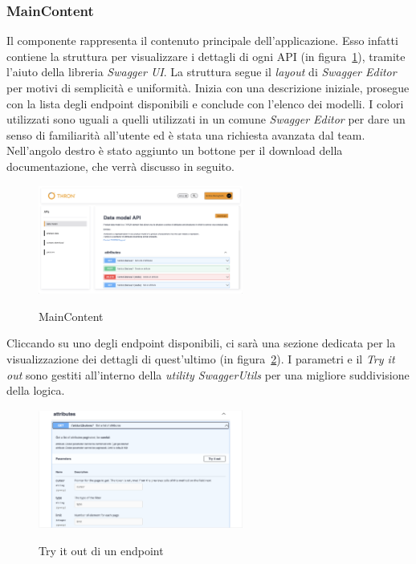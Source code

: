 \subsubsection{MainContent}\label{subsubsec:main-content}
Il componente rappresenta il contenuto principale dell'applicazione. Esso infatti contiene la struttura per visualizzare i dettagli di ogni API (in figura~\ref{fig:main-content}), tramite l'aiuto 
della libreria \textit{Swagger UI}.
La struttura segue il \textit{layout} di \textit{Swagger Editor} per motivi di semplicità e uniformità. Inizia con una descrizione iniziale, prosegue con la lista degli endpoint disponibili e conclude con l'elenco dei modelli.
I colori utilizzati sono uguali a quelli utilizzati in un comune \textit{Swagger Editor} per dare un senso di familiarità all'utente ed è stata una richiesta avanzata dal team.
Nell'angolo destro è stato aggiunto un bottone per il download della documentazione, che verrà discusso in seguito.
\begin{figure}[ht]
  \centering
  \includegraphics[width=0.6\textwidth, alt={Sezione per la visualizzazione dei dettagli di un API}]{images/frontend/DataModelView.jpg}
  \caption{MainContent}\label{fig:main-content}
\end{figure}
\pagebreak

Cliccando su uno degli endpoint disponibili, ci sarà una sezione dedicata per la visualizzazione dei dettagli di quest'ultimo (in figura~\ref{fig:try-it-out}).
I parametri e il \textit{Try it out} sono gestiti all'interno della \textit{utility SwaggerUtils} per una migliore suddivisione della logica.

\begin{figure}[ht]
  \centering
  \includegraphics[width=0.6\textwidth, alt={Sezione try it out di un endpoint}]{images/frontend/TryItOut.jpg}
  \caption{Try it out di un endpoint}\label{fig:try-it-out}
\end{figure}

